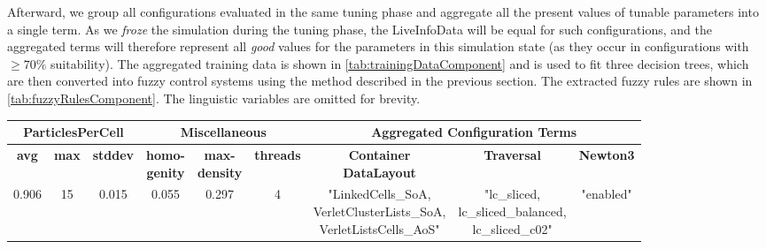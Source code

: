 Afterward, we group all configurations evaluated in the same tuning phase and aggregate all the present values of tunable parameters into a single term. As we \emph{froze} the simulation during the tuning phase, the LiveInfoData will be equal for such configurations, and the aggregated terms will therefore represent all \emph{good} values for the parameters in this simulation state (as they occur in configurations with $\geq 70\%$ suitability). The aggregated training data is shown in \autoref{tab:trainingDataComponent} and is used to fit three decision trees, which are then converted into fuzzy control systems using the method described in the previous section. The extracted fuzzy rules are shown in \autoref{tab:fuzzyRulesComponent}. The linguistic variables are omitted for brevity.

\begin{table}[H]
    \centering
    \tiny
    \def\arraystretch{2.5}
    \begin{tabular}{|c|c|c|c|c|c|c|c|c|}
        \cline{1-9}
        \multicolumn{3}{|c|}{ \textbf{ParticlesPerCell}} & \multicolumn{3}{c|}{\textbf{Miscellaneous}} & \multicolumn{3}{c|}{\textbf{Aggregated Configuration Terms}}                                                                                                                               \\
        \hline
        \textbf{avg}                                     & \textbf{max}                                & \textbf{stddev}                                              & \tabularCenterstack{c}{\textbf{homo-}                                                                                       \\ \textbf{genity}} & \tabularCenterstack{c}{\textbf{max-} \\ \textbf{density}} & \textbf{threads} & \tabularCenterstack{c}{\textbf{Container} \\ \textbf{DataLayout}}& \textbf{Traversal} & \textbf{Newton3}  \\
        \hline
        0.906                                            & 15                                          & 0.015                                                        & 0.055                                 & 0.297  & 4      & \tabularCenterstack{c}{"LinkedCells\_SoA,                         \\ VerletClusterLists\_SoA, \\ VerletListsCells\_AoS"} & \tabularCenterstack{c}{"lc\_sliced, \\ lc\_sliced\_balanced, \\ lc\_sliced\_c02"} & "enabled"   \\

\end{tabular}
\end{table}
